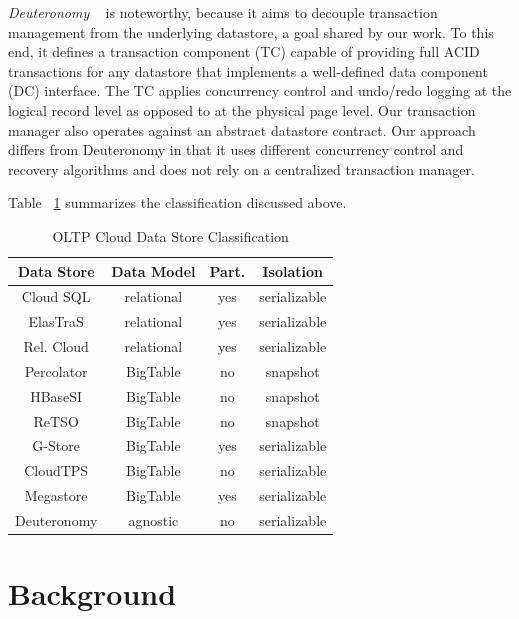 \documentclass[10pt,final,journal]{IEEEtran}
\begin{document}
\emph{Deuteronomy} ~\cite{Levandoski:2011:8530161} is noteworthy, because it aims to decouple transaction management from the underlying datastore, a goal shared by our work. To this end, it defines a transaction component (TC) capable of providing full ACID transactions for any datastore that implements a well-defined data component (DC) interface. The TC applies concurrency control and undo/redo logging at the logical record level as opposed to at the physical page level. Our transaction manager also operates against an abstract datastore contract. Our approach differs from Deuteronomy in that it uses different concurrency control and recovery algorithms and does not rely on a centralized transaction manager.

Table ~\ref{classification} summarizes the classification discussed above.

\begin{table}[!t]
\renewcommand{\arraystretch}{1.3}
\caption{OLTP Cloud Data Store Classification}
\label{classification}
\centering
\begin{tabular}{|c|c|c|c|}
\hline
\bfseries Data Store  & \bfseries Data Model & \bfseries  Part. & \bfseries Isolation \\
\hline
\hline
Cloud SQL & relational & yes & serializable \\
ElasTraS & relational & yes & serializable \\
Rel. Cloud & relational & yes & serializable \\
Percolator & BigTable & no & snapshot \\
HBaseSI & BigTable & no & snapshot \\
ReTSO & BigTable & no & snapshot \\
G-Store & BigTable & yes & serializable \\
CloudTPS & BigTable & no & serializable \\
Megastore & BigTable & yes & serializable \\
Deuteronomy & agnostic & no &serializable \\

\hline
\end{tabular}
\end{table}



\section{Background}
\end{document}
